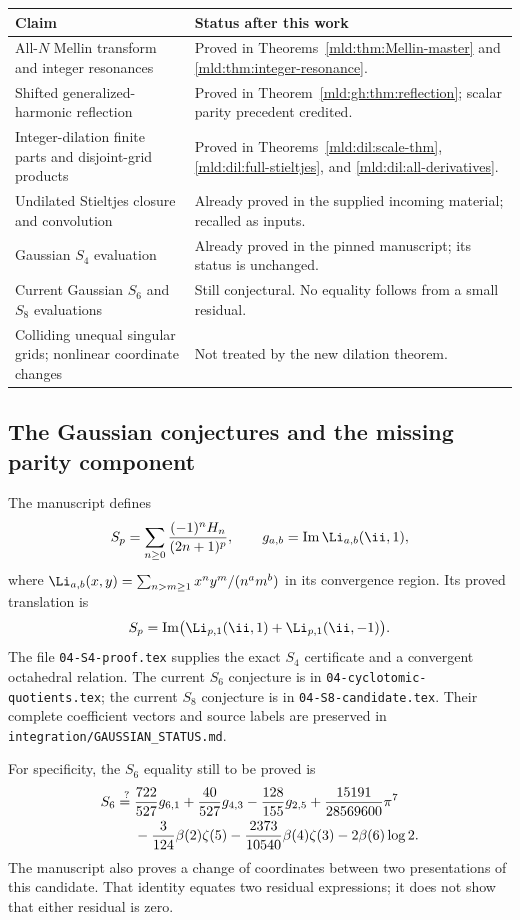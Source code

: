 \begin{center}
\begin{tabularx}{\textwidth}{@{}>{\raggedright\arraybackslash}p{}Y@{}}
\toprule
Claim & Status after this work\\
\midrule
All-$N$ Mellin transform and integer resonances & Proved in
Theorems~\ref{mld:thm:Mellin-master} and \ref{mld:thm:integer-resonance}.\\
Shifted generalized-harmonic reflection & Proved in
Theorem~\ref{mld:gh:thm:reflection}; scalar parity precedent credited.\\
Integer-dilation finite parts and disjoint-grid products & Proved in
Theorems~\ref{mld:dil:scale-thm}, \ref{mld:dil:full-stieltjes}, and
\ref{mld:dil:all-derivatives}.\\
Undilated Stieltjes closure and convolution & Already proved in the
supplied incoming material; recalled as inputs.\\
Gaussian $S_4$ evaluation & Already proved in the pinned manuscript;
its status is unchanged.\\
Current Gaussian $S_6$ and $S_8$ evaluations & Still conjectural.
No equality follows from a small residual.\\
Colliding unequal singular grids; nonlinear coordinate changes &
Not treated by the new dilation theorem.\\
\bottomrule
\end{tabularx}
\end{center}

\subsection{The Gaussian conjectures and the missing parity component}

The manuscript defines
\[
 S_p=\sum_{n\ge0}\frac{(-1)^nH_n}{(2n+1)^p},\qquad
 g_{a,b}=\operatorname{Im}\Li_{a,b}(\ii,1),
\]
where
$\Li_{a,b}(x,y)=\sum_{n>m\ge1}x^ny^m/(n^am^b)$ in its convergence
region. Its proved translation is
\[
 S_p=\operatorname{Im}\bigl(\Li_{p,1}(\ii,1)
                                  +\Li_{p,1}(\ii,-1)\bigr).
\]
The file \texttt{04-S4-proof.tex} supplies the exact $S_4$ certificate
and a convergent octahedral relation. The current $S_6$ conjecture is in
\texttt{04-cyclotomic-quotients.tex}; the current $S_8$ conjecture is in
\texttt{04-S8-candidate.tex}. Their complete coefficient vectors and
source labels are preserved in \texttt{integration/GAUSSIAN\_STATUS.md}.

For specificity, the $S_6$ equality still to be proved is
\begin{align}
 S_6\stackrel{?}{={}}&\frac{722}{527}g_{6,1}
  +\frac{40}{527}g_{4,3}-\frac{128}{155}g_{2,5}
  +\frac{15191}{28569600}\pi^7\notag\\
 &-\frac3{124}\beta(2)\zeta(5)
  -\frac{2373}{10540}\beta(4)\zeta(3)-2\beta(6)\log2.
 \label{mld:eq:S6-open}
\end{align}
The manuscript also proves a change of coordinates between two
presentations of this candidate. That identity equates two residual
expressions; it does not show that either residual is zero.

